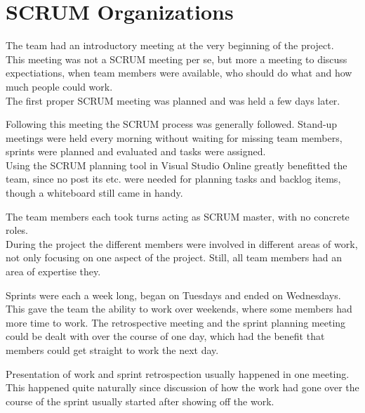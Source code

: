 \section{SCRUM Organizations}

The team had an introductory meeting at the very beginning of the project. \\
This meeting was not a SCRUM meeting per se, but more a meeting to discuss expectiations, when team members were available, who should do what and how much people could work.\\
The first proper SCRUM meeting was planned and was held a few days later.

Following this meeting the SCRUM process was generally followed. Stand-up meetings were held every morning without waiting for missing team members, sprints were planned and evaluated and tasks were assigned. \\
Using the SCRUM planning tool in Visual Studio Online greatly benefitted the team, since no post its etc. were needed for planning tasks and backlog items, though a whiteboard still came in handy.

The team members each took turns acting as SCRUM master, with no concrete roles.\\
During the project the different members were involved in different areas of work, not only focusing on one aspect of the project. Still, all team members had an area of expertise they.

Sprints were each a week long, began on Tuesdays and ended on Wednesdays.\\
This gave the team the ability to work over weekends, where some members had more time to work. The retrospective meeting and the sprint planning meeting could be dealt with over the course of one day, which had the benefit that members could get straight to work the next day.

Presentation of work and sprint retrospection usually happened in one meeting. This happened quite naturally since discussion of how the work had gone over the course of the sprint usually started after showing off the work.